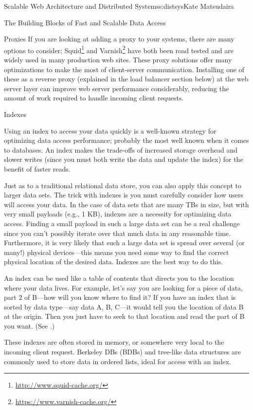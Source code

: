\begin{aosachapter}{Scalable Web Architecture and Distributed Systems}{s:distsys}{Kate Matsudaira}
\begin{aosasect1}{The Building Blocks of Fast and Scalable Data Access}
\begin{aosasect2}{Proxies}
If you are looking at adding a proxy to your systems, there are many
options to
consider;
Squid\footnote{\url{http://www.squid-cache.org/}} and
Varnish\footnote{\url{https://www.varnish-cache.org/}} have both been
road tested and are widely used in many production web sites. These
proxy solutions offer many optimizations to make the most of
client-server communication. Installing one of these as a reverse
proxy (explained in the load balancer section below) at the web server
layer can improve web server performance considerably, reducing the
amount of work required to handle incoming client requests.

\end{aosasect2}

\begin{aosasect2}{Indexes}

Using an index to access your data quickly is a well-known strategy
for optimizing data access performance; probably the most well known 
when it comes to databases. An index makes the trade-offs of
increased storage overhead and slower writes (since you must both
write the data and update the index) for the benefit of faster reads.


Just as to a traditional relational data store, you can also apply
this concept to larger data sets. The trick with indexes is you must
carefully consider how users will access your data. In the case of
data sets that are many TBs in size, but with very small payloads
(e.g., 1 KB), indexes are a necessity for optimizing data
access. Finding a small payload in such a large data set can be a real
challenge since you can't possibly iterate over that much data in any
reasonable time. Furthermore, it is very likely that such a large data
set is spread over several (or many!) physical devices---this means
you need some way to find the correct physical location of the desired
data. Indexes are the best way to do this. 

An index can be used like a table of contents that directs you to the
location where your data lives. 
For example, let's say you are looking for a
piece of data, part 2 of B---how will you know where to find it? If
you have an index that is sorted by data type---say data A, B, C---it
would tell you the location of data B at the origin. Then you just
have to seek to that location and read the part of B you want. 
(See .)

These indexes are often stored in memory, or somewhere very local to
the incoming client request. Berkeley DBs (BDBs) and tree-like
data structures are commonly used to store data in ordered lists,
ideal for access with an index.


\end{aosasect2}
\end{aosasect1}
\end{aosachapter}
